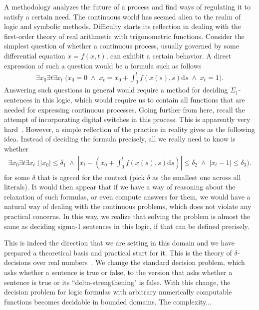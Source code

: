 \documentclass[10pt]{article}
\theoremstyle{definition}
\begin{document}
A methodology analyzes the future of a process and find ways of regulating it to satisfy a certain need. The continuous world has seemed alien to the realm of logic and symbolic methods. Difficulty starts its reflection in dealing with the first-order theory of real arithmetic with trigonometric functions. Consider the simplest question of whether a continuous process, usually governed by some differential equation $\dot{x} = f(x,t)$, can exhibit a certain behavior. A direct expression of such a question would be a formula such as follows
\begin{eqnarray}
\exists x_0 \exists t \exists x_t\; \bigg(x_0 = 0 \;\wedge\; x_t = x_0 + \int_{0}^t f(x(s),s)\mathrm{d}s\; \wedge\; x_t = 1\bigg).
\end{eqnarray}
Answering such questions in general would require a method for deciding $\Sigma_1$-sentences in this logic, which would require us to contain all functions that are needed for expressing continuous processes. Going further from here, recall the attempt of incorporating digital switches in this process. This is apparently very hard~\cite{}. However, a simple reflection of the practice in reality gives as the following idea. Instead of deciding the formula precisely, all we really need to know is whether 
\begin{eqnarray}
\exists x_0 \exists t \exists x_t\; \bigg(|x_0| \leq \delta_1 \;\wedge\; |x_t - (x_0 + \int_{0}^t f(x(s),s)\mathrm{d}s)| \leq \delta_2\; \wedge\; |x_t - 1|\leq \delta_3\bigg).
\end{eqnarray}
for some $\delta$ that is agreed for the context (pick $\delta$ as the smallest one across all literals). It would then appear that if we have a way of reasoning about the relaxation of such formulas, or even compute answers for them, we would have a natural way of dealing with the continuous problems, which does not violate any practical concerns. In this way, we realize that solving the problem is almost the same as deciding sigma-1 sentences in this logic, if that can be defined precisely. 

This is indeed the direction that we are setting in this domain and we have prepared a theoretical basis and practical start for it. This is the theory of $\delta$-decisions over real numbers~\cite{}. We change the standard decision problem, which asks whether a sentence is true or false, to the version that asks whether a sentence is true or its ``delta-strengthening" is false. With this change, the decision problem for logic formulas with arbitrary numerically computable functions becomes decidable in bounded domains. The complexity... 
\end{document}
